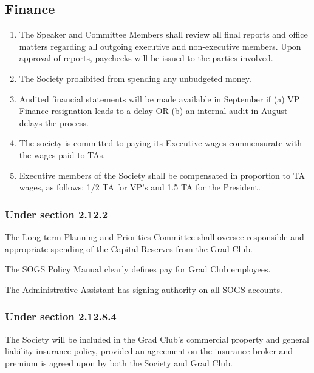 \subsection{Finance}
\begin{enumerate}
\item The Speaker and Committee Members shall review all final reports and office matters regarding all outgoing executive and non-executive members. Upon approval of reports, paychecks will be issued to the parties involved.  
\item The Society prohibited from spending any unbudgeted money.  
\item Audited financial statements will be made available in September if (a) VP Finance resignation leads to a delay OR (b) an internal audit in August delays the process.  
\item The society is committed to paying its Executive wages commensurate with the wages paid to TAs. 
\item Executive members of the Society shall be compensated in proportion to TA wages, as follows: 1/2 TA for VP's and 1.5 TA for the President.  
\end{enumerate}


\subsubsection{Under section 2.12.2}
\begin{longenum}[ label*=\thesubsubsection.\arabic*., align=left]
\item The Long-term Planning and Priorities Committee shall oversee responsible and appropriate spending of the Capital Reserves from the Grad Club. 
\item The SOGS Policy Manual clearly defines pay for Grad Club employees.  
\item The Administrative Assistant has signing authority on all SOGS accounts.  
\end{longenum}

\subsubsection{Under section 2.12.8.4}
\begin{longenum}[ label*=\thesubsubsection.\arabic*., align=left]
\item	The Society will be included in the Grad Club's commercial property and general liability insurance policy, provided an agreement on the insurance broker and premium is agreed upon by both the Society and Grad Club.

\end{longenum}

